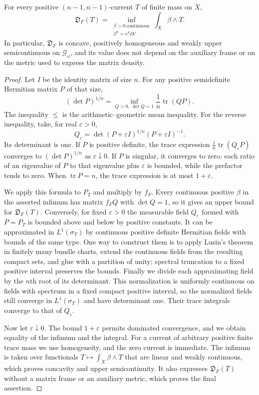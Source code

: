 \begin{lemma}\label{lem:weak-gaud-determinant-dual}
For every positive $(n-1,n-1)$-current $T$ of finite mass on $X$,
\[
 \mathfrak D_F(T)
   =\inf_{\substack{\beta>0\ \mathrm{continuous}\\\beta^n=\mathrm{e}^F\mathrm{d}V}}
                         \int_X\beta\wedge T.
\]
In particular, $\mathfrak D_F$ is concave, positively homogeneous and weakly upper semicontinuous on $\mathscr G_\omega$, and its value does not depend on the auxiliary frame or on the metric used to express the matrix density.
\end{lemma}
\begin{proof}
Let $I$ be the identity matrix of size $n$. For any positive semidefinite Hermitian matrix $P$ of that size,
\[
 (\det P)^{1/n}
      =\inf_{Q>0,\ \det Q=1}\frac1n\operatorname{tr}(QP).
\]
The inequality $\leq$ is the arithmetic--geometric mean inequality. For the reverse inequality, take, for real $\varepsilon>0$,
\[
 Q_\varepsilon=
       \det(P+\varepsilon I)^{1/n}(P+\varepsilon I)^{-1}.
\]
Its determinant is one. If $P$ is positive definite, the trace expression $\frac1n\operatorname{tr}(Q_\varepsilon P)$ converges to $(\det P)^{1/n}$ as $\varepsilon\downarrow0$. If $P$ is singular, it converges to zero: each ratio of an eigenvalue of $P$ to that eigenvalue plus $\varepsilon$ is bounded, while the prefactor tends to zero. When $\operatorname{tr}P=n$, the trace expression is at most $1+\varepsilon$.

We apply this formula to $P_T$ and multiply by $f_F$. Every continuous positive $\beta$ in the asserted infimum has matrix $f_FQ$ with $\det Q=1$, so it gives an upper bound for $\mathfrak D_F(T)$. Conversely, for fixed $\varepsilon>0$ the measurable field $Q_\varepsilon$ formed with $P=P_T$ is bounded above and below by positive constants. It can be approximated in $L^1(\sigma_T)$ by continuous positive definite Hermitian fields with bounds of the same type. One way to construct them is to apply Lusin's theorem in finitely many bundle charts, extend the continuous fields from the resulting compact sets, and glue with a partition of unity; spectral truncation to a fixed positive interval preserves the bounds. Finally we divide each approximating field by the $n$th root of its determinant. This normalization is uniformly continuous on fields with spectrum in a fixed compact positive interval, so the normalized fields still converge in $L^1(\sigma_T)$ and have determinant one. Their trace integrals converge to that of $Q_\varepsilon$.

Now let $\varepsilon\downarrow0$. The bound $1+\varepsilon$ permits dominated convergence, and we obtain equality of the infimum and the integral. For a current of arbitrary positive finite trace mass we use homogeneity, and the zero current is immediate. The infimum is taken over functionals $T\mapsto\int_X\beta\wedge T$ that are linear and weakly continuous, which proves concavity and upper semicontinuity. It also expresses $\mathfrak D_F(T)$ without a matrix frame or an auxiliary metric, which proves the final assertion.
\end{proof}

